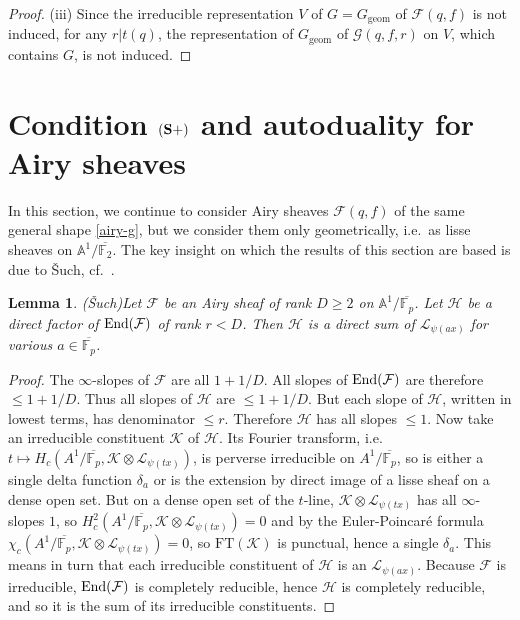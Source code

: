 \documentclass[11pt]{amsart}
\theoremstyle{plain}
\newtheorem{lem}[thm]{Lemma}
\theoremstyle{definition}
\numberwithin{thm}{section}
\numberwithin{equation}{thm}
\newcommand{\End}{{\rm End}}
\newcommand{\sF}{{\mathcal F}}
\newcommand{\sG}{{\mathcal G}}
\newcommand{\sH}{{\mathcal H}}
\newcommand{\sK}{{\mathcal K}}
\newcommand{\sL}{{\mathcal L}}
\newcommand{\A}{{\mathbb A}}
\newcommand{\F}{{\mathbb F}}
\newcommand{\0}{\emptyset}
\newcommand{\geo}{{\mathrm {geom}}}
\newcommand{\CSP}{\mathrm {({\bf S+})}}
\newcommand{\FT}{\mathrm{FT}}
\begin{document}
\begin{proof}
\smallskip
(iii) Since the irreducible representation $V$ of $G=G_\geo$ of $\sF(q,f)$ is not induced, for any $r|t(q)$, 
the representation of $G_\geo$ of $\sG(q,f,r)$ on $V$, which contains $G$, is not induced. 
\end{proof}

\section{Condition $\CSP$ and autoduality for Airy sheaves}
In this section, we continue to consider Airy sheaves $\sF(q,f)$ of the same general shape \eqref{airy-g}, but we consider them only geometrically, i.e.\ as lisse sheaves on $\A^1/\overline{\F_2}$. The key insight on which the results of this section are based is due to \v{S}uch, cf.\  \cite[Proposition 11.1]{Such}.
 
 \begin{lem} {\rm (\v{S}uch)}\label{suchlemma}
 Let $\sF$ be an Airy sheaf of rank $D \ge 2$ on $\A^1/\overline{\F_p}$. Let $\sH$ be a direct factor of $\End(\sF)$ of rank $r<D$. Then $\sH$ is a direct sum of $\sL_{\psi(ax)}$ for various $a \in \overline{\F_p}$.
 \end{lem}
 \begin{proof}The $\infty$-slopes of $\sF$ are all $1 + 1/D$. All slopes of $\End(\sF)$ are therefore $\le 1 + 1/D$. Thus all slopes of $\sH$ are $\le 1+1/D$. But each slope of $\sH$, written in lowest terms, has denominator $\le r$. Therefore $\sH$ has all slopes $\le 1$. Now take an irreducible constituent $\sK$ of $\sH$. Its Fourier transform, i.e.\ $t \mapsto H_c(A^1/\overline{\F_p},\sK\otimes \sL_{\psi(tx)})$, is perverse irreducible on $A^1/\overline{\F_p}$, so is either a single delta function $\delta_{a}$ or is the extension by direct image of a lisse sheaf on a dense open set. But on a dense open set of the $t$-line, $\sK\otimes \sL_{\psi(tx)}$ has all $\infty$-slopes $1$, so $H^2_c(A^1/\overline{\F_p},\sK\otimes \sL_{\psi(tx)})=0$ and by the Euler-Poincar\'{e} formula 
$\chi_c(A^1/\overline{\F_p},\sK\otimes \sL_{\psi(tx)}) =0$, so $\FT(\sK)$ is punctual, hence a single $\delta_{a}$. This means in turn that each irreducible constituent of $\sH$ is an  $\sL_{\psi(ax)}$. Because $\sF$ is irreducible, $\End(\sF)$ is completely reducible, hence $\sH$ is completely reducible, and so it 
is the sum of its irreducible constituents.
 \end{proof}
\end{document}
